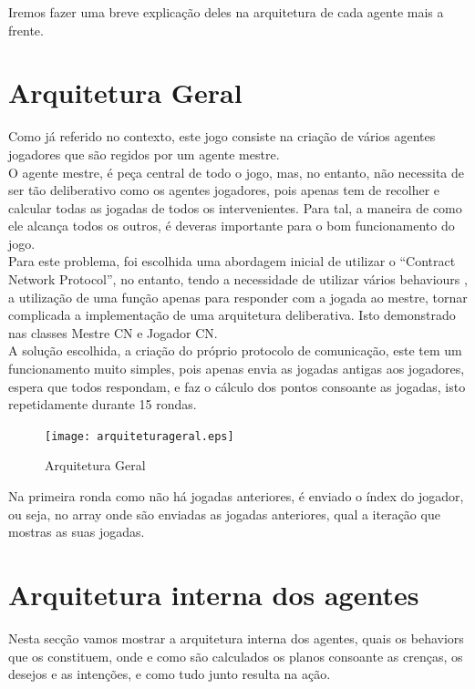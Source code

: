 \documentclass[12pt]{article}
\begin{document}
    
    Iremos fazer uma breve explicação deles na arquitetura de cada agente mais a frente.
	
	\newpage
	\section*{Arquitetura Geral}
	Como já referido no contexto, este jogo consiste na criação de vários agentes jogadores que são regidos por um agente mestre.\\
    O agente mestre, é peça central de todo o jogo, mas, no entanto, não necessita de ser tão deliberativo como os agentes jogadores, pois apenas tem de recolher e calcular todas as jogadas de todos os intervenientes. Para tal, a maneira de como ele alcança todos os outros, é deveras importante para o bom funcionamento do jogo. \\
    Para este problema, foi escolhida uma abordagem inicial de utilizar o “Contract Network Protocol”, no entanto, tendo a necessidade de utilizar vários behaviours , a utilização de uma função apenas para responder com a jogada ao mestre, tornar complicada a implementação de uma arquitetura deliberativa. Isto demonstrado nas classes Mestre CN e Jogador CN.\\
    A solução escolhida, a criação do próprio protocolo de comunicação, este tem um funcionamento muito simples, pois apenas envia as jogadas antigas aos jogadores, espera que todos respondam, e faz o cálculo dos pontos consoante as jogadas, isto repetidamente durante 15 rondas.
    
    	
	\begin{figure}[h]
		\centering
		\texttt{[image: arquiteturageral.eps]}
		\caption{Arquitetura Geral}
		\label{fig:arquiteturageral}
	\end{figure}
	
	
	Na primeira ronda como não há jogadas anteriores, é enviado o índex do jogador, ou seja, no array onde são enviadas as jogadas anteriores, qual a iteração que mostras as suas jogadas.\\
	
	
	\newpage
	\section*{Arquitetura interna dos agentes}
	
	Nesta secção vamos mostrar a arquitetura interna dos agentes, quais os behaviors que os constituem, onde e como são calculados os planos consoante as crenças, os desejos e as intenções, e como tudo junto resulta na ação.\\
	
\end{document}
